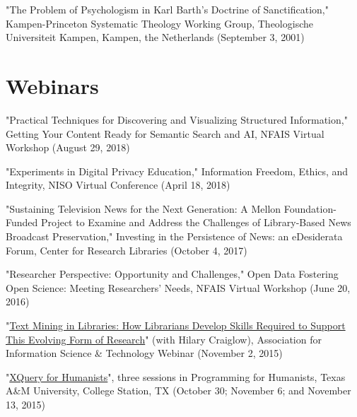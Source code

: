 \documentclass[10pt]{res} %
\begin{document}
\begin{resume}
\begin{hangparas}{.25in}{1}"The Problem of Psychologism in Karl Barth’s Doctrine of Sanctification," Kampen-Princeton Systematic Theology Working Group, Theologische Universiteit Kampen, Kampen, the Netherlands (September 3, 2001)\end{hangparas}

\section{Webinars}

\begin{hangparas}{.25in}{1}"Practical Techniques for Discovering and Visualizing Structured Information," Getting Your Content Ready for Semantic Search and AI, NFAIS Virtual Workshop (August 29, 2018)\end{hangparas}

\begin{hangparas}{.25in}{1}"Experiments in Digital Privacy Education," Information Freedom, Ethics, and Integrity, NISO Virtual Conference (April 18, 2018)\end{hangparas}

\begin{hangparas}{.25in}{1}"Sustaining Television News for the Next Generation: A Mellon Foundation-Funded Project to Examine and Address the Challenges of Library-Based News Broadcast Preservation," Investing in the Persistence of News: an eDesiderata Forum, Center for Research Libraries (October 4, 2017)\end{hangparas}

\begin{hangparas}{.25in}{1}"Researcher Perspective: Opportunity and Challenges," Open Data Fostering Open Science: Meeting Researchers’ Needs, NFAIS Virtual Workshop (June 20, 2016)\end{hangparas}

\begin{hangparas}{.25in}{1}"\href{https://www.asist.org/events/webinars/text-mining-in-libraries/}{Text Mining in Libraries: How Librarians Develop Skills Required to Support This Evolving Form of Research}" (with Hilary Craiglow), Association for Information Science \& Technology Webinar (November 2, 2015)\end{hangparas}

\begin{hangparas}{.25in}{1}"\href{http://programming4humanists.tamu.edu/syllabus-fall-2015/}{XQuery for Humanists}", three sessions in Programming for Humanists, Texas A\&M University, College Station, TX (October 30; November 6; and November 13, 2015)\end{hangparas}


\end{resume}
\end{document}
